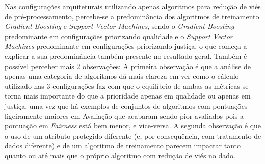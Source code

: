 \documentclass[portugues]{ic-tese}
\begin{document}
Nas configurações arquiteturais utilizando apenas algoritmos para redução de viés de pré-processamento, percebe-se a predominância dos algoritmos de treinamento \textit{Gradient Boosting} e \textit{Support Vector Machines}, sendo o \textit{Gradient Boosting} predominante em configurações priorizando qualidade e o \textit{Support Vector Machines} predominante em configurações priorizando justiça, o que começa a explicar a sua predominância também presente no resultado geral. Também é possível perceber mais 2 observações: A primeira observação é que a análise de apenas uma categoria de algoritmos dá mais clareza em ver como o cálculo utilizado nas 3 configurações faz com que o equilíbrio de ambas as métricas se torna mais importante do que a prioridade apenas em qualidade ou apenas em justiça, uma vez que há exemplos de conjuntos de algoritmos com pontuações ligeiramente maiores em Avaliação que acabaram sendo pior avaliados pois a pontuação em \textit{Fairness} está bem menor, e vice-versa. A segunda observação é que o uso de um atributo protegido diferente (e, por consequência, com tratamento de dados diferente) e de um algoritmo de treinamento parecem impactar tanto quanto ou até mais que o próprio algoritmo com redução de viés no dado.

\begin{table}[H]
\begin{center}
  \caption{Melhores configurações escolhidas pelo Gerenciador Autonômico \\ Algoritmos para redução de viés de processamento - 50\% Avaliação/50\% \textit{Fairness}}
\label{tbl:ScoreMAPEKInproc5050}
\end{center}
\end{table}
\end{document}
